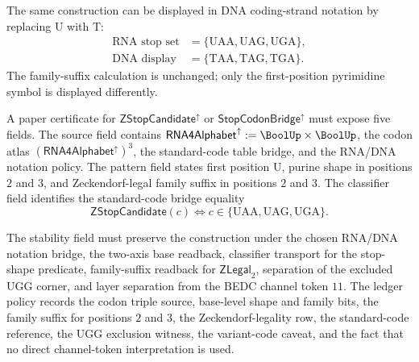 \begin{corollary}
\label{cor:philosophy-rna-dna-stop-notation}
The same construction can be displayed in DNA coding-strand notation by
replacing $\mathrm{U}$ with $\mathrm{T}$:
$$
\begin{aligned}
  \text{RNA stop set} &= \{\mathrm{UAA},\mathrm{UAG},\mathrm{UGA}\},\\
  \text{DNA display} &= \{\mathrm{TAA},\mathrm{TAG},\mathrm{TGA}\}.
\end{aligned}
$$
The family-suffix calculation is unchanged; only the first-position
pyrimidine symbol is displayed differently.
\end{corollary}

\begin{definition}
\label{def:philosophy-zstop-certificate-fields}
A paper certificate for
$\mathsf{ZStopCandidate}^{\uparrow}$ or
$\mathsf{StopCodonBridge}^{\uparrow}$ must expose five fields. The
source field contains
$\mathsf{RNA4Alphabet}^{\uparrow}:=\BoolUp\times\BoolUp$, the codon
atlas $(\mathsf{RNA4Alphabet}^{\uparrow})^{3}$, the standard-code table
bridge, and the RNA/DNA notation policy. The pattern field states first
position $\mathrm{U}$, purine shape in positions $2$ and $3$, and
Zeckendorf-legal family suffix in positions $2$ and $3$. The classifier
field identifies the standard-code bridge equality
$$
  \mathsf{ZStopCandidate}(c)
  \Longleftrightarrow
  c\in\{\mathrm{UAA},\mathrm{UAG},\mathrm{UGA}\}.
$$
\end{definition}

\begin{definition}
\label{def:philosophy-zstop-stability-ledger-fields}
The stability field must preserve the construction under the chosen
RNA/DNA notation bridge, the two-axis base readback, classifier
transport for the stop-shape predicate, family-suffix readback for
$\mathsf{ZLegal}_{2}$, separation of the excluded $\mathrm{UGG}$
corner, and layer separation from the BEDC channel token $11$. The
ledger policy records the codon triple source, base-level shape and
family bits, the family suffix for positions $2$ and $3$, the
Zeckendorf-legality row, the standard-code reference, the
$\mathrm{UGG}$ exclusion witness, the variant-code caveat, and the
fact that no direct channel-token interpretation is used.
\end{definition}

